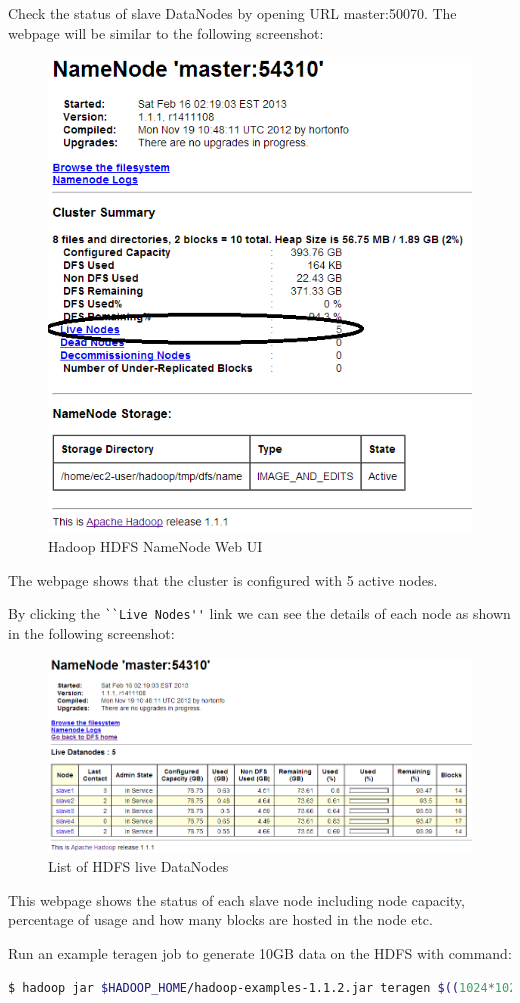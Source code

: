 Check the status of slave DataNodes by opening URL master:50070. The webpage will be similar to the following screenshot: 
\begin{figure}[ht]
  \centering
  \includegraphics[width=.6\textwidth]{figs/5163os_03_04.png}
  \caption{Hadoop HDFS NameNode Web UI}\label{fig:namenode.webui}
\end{figure} 
The webpage shows that the cluster is configured with 5 active nodes.

By clicking the \verb|``Live Nodes''| link we can see the details of each node as shown in the following screenshot:
\begin{figure}[h]
  \centering
  \includegraphics[width=.8\textwidth]{figs/5163os_03_05.png}
  \caption{List of HDFS live DataNodes}\label{fig:hdfs.datanodes}
\end{figure} 
This webpage shows the status of each slave node including node capacity, percentage of usage and how many blocks are hosted in the node etc.

Run an example teragen job to generate 10GB data on the HDFS with command:
\lstset{style=bashstyle}
\begin{lstlisting}[language=bash]
$ hadoop jar $HADOOP_HOME/hadoop-examples-1.1.2.jar teragen $((1024*1024*1024* 10/100)) teraout
\end{lstlisting}

